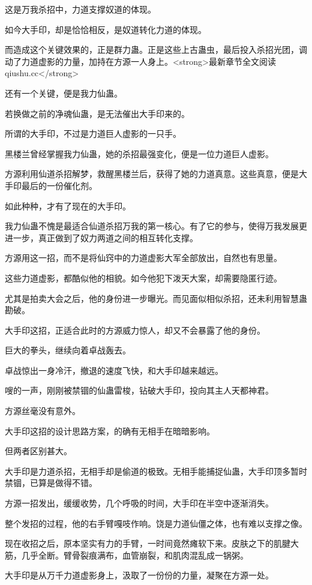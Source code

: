 \begin{this_body}
这是万我杀招中，力道支撑奴道的体现。

如今大手印，却是恰恰相反，是奴道转化力道的体现。

而造成这个关键效果的，正是群力蛊。正是这些上古蛊虫，最后投入杀招光团，调动了力道虚影的力量，加持在方源一人身上。<strong>最新章节全文阅读qiushu.cc</strong>

还有一个关键，便是我力仙蛊。

若换做之前的净魂仙蛊，是无法催出大手印来的。

所谓的大手印，不过是力道巨人虚影的一只手。

黑楼兰曾经掌握我力仙蛊，她的杀招最强变化，便是一位力道巨人虚影。

方源利用仙道杀招解梦，救醒黑楼兰后，获得了她的力道真意。这些真意，便是大手印最后的一份催化剂。

如此种种，才有了现在的大手印。

我力仙蛊不愧是最适合仙道杀招万我的第一核心。有了它的参与，使得万我发展更进一步，真正做到了奴力两道之间的相互转化支撑。

方源用这一招，而不是将仙窍中的力道虚影大军全部放出，自然也有思量。

这些力道虚影，都酷似他的相貌。如今他犯下泼天大案，却需要隐匿行迹。

尤其是拍卖大会之后，他的身份进一步曝光。而见面似相似杀招，还未利用智慧蛊勘破。

大手印这招，正适合此时的方源威力惊人，却又不会暴露了他的身份。

巨大的拳头，继续向着卓战轰去。

卓战惊出一身冷汗，撤退的速度飞快，和大手印越来越远。

嗖的一声，刚刚被禁锢的仙蛊雷梭，钻破大手印，投向其主人天都神君。

方源丝毫没有意外。

大手印这招的设计思路方案，的确有无相手在暗暗影响。

但两者区别甚大。

大手印是力道杀招，无相手却是偷道的极致。无相手能捕捉仙蛊，大手印顶多暂时禁锢，已算是做得不错。

方源一招发出，缓缓收势，几个呼吸的时间，大手印在半空中逐渐消失。

整个发招的过程，他的右手臂嘎吱作响。饶是力道仙僵之体，也有难以支撑之像。

现在收招之后，原本坚实有力的手臂，一时间竟然瘫软下来。皮肤之下的肌腱大筋，几乎全断。臂骨裂痕满布，血管崩裂，和肌肉混乱成一锅粥。

大手印是从万千力道虚影身上，汲取了一份份的力量，凝聚在方源一处。


\end{this_body}
